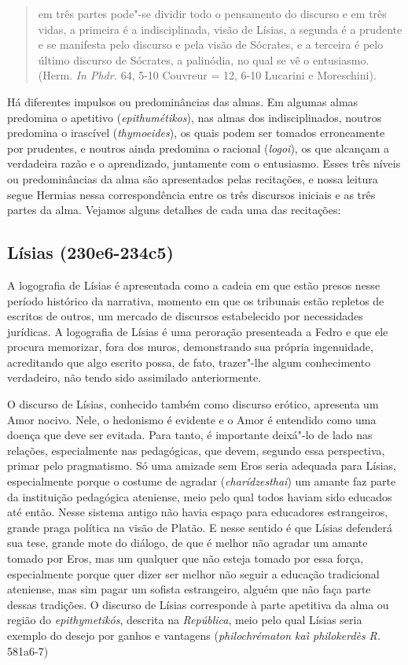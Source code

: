  

\begin{quote}
em três partes pode"-se dividir todo o pensamento do discurso e em três
vidas,
 a primeira é a indisciplinada, visão de Lísias, a segunda é a
prudente e se manifesta pelo discurso e pela visão de Sócrates, e a
terceira é pelo último discurso de Sócrates, a palinódia, no qual se vê
o entusiasmo. (Herm. \emph{In Phdr.} 64, 5-10 Couvreur = 12, 6-10
Lucarini e Moreschini).
\end{quote}

 

Há diferentes impulsos ou predominâncias das almas. Em algumas almas
predomina o apetitivo (\emph{epithumétikos}), nas almas dos
indisciplinados, noutros predomina o irascível (\emph{thymoeides}), os
quais podem ser tomados erroneamente por prudentes, e noutros ainda
predomina o racional (\emph{logoi}), os que alcançam a verdadeira razão
e o aprendizado, juntamente com o entusiasmo. Esses três níveis ou
predominâncias da alma são apresentados pelas recitações, e nossa leitura
segue Hermias nessa correspondência entre os três discursos iniciais e
as três partes da alma. Vejamos alguns detalhes de cada uma das
recitações:


\subsection{Lísias (230e6-234c5)} 


A logografia de Lísias é apresentada
como a cadeia em que estão presos nesse período histórico da narrativa,
momento em que os tribunais estão repletos de escritos de outros, um
mercado de discursos estabelecido por necessidades jurídicas. 
A logografia de Lísias é uma peroração presenteada a Fedro e que ele
procura memorizar, fora dos muros, demonstrando sua própria ingenuidade,
acreditando que algo escrito possa, de fato, trazer"-lhe algum
conhecimento verdadeiro, não tendo sido assimilado anteriormente.

O discurso de Lísias, conhecido também como discurso erótico, apresenta
um Amor nocivo. Nele, o hedonismo é evidente e o Amor é entendido como
uma doença que deve ser evitada. Para tanto, é importante deixá"-lo de
lado nas relações, especialmente nas pedagógicas, que devem, segundo
essa perspectiva, primar pelo pragmatismo. Só uma amizade sem Eros
seria adequada para Lísias, especialmente porque o costume de agradar
(\emph{charídzesthai}) um amante faz parte da instituição pedagógica
ateniense, meio pelo qual todos haviam sido educados até então. Nesse
sistema antigo não havia espaço para educadores estrangeiros, grande
praga política na visão de Platão. E nesse sentido é que Lísias
defenderá sua tese, grande mote do diálogo, de que é melhor não agradar
um amante tomado por Eros, mas um qualquer que não esteja tomado por
essa força, especialmente porque quer dizer ser melhor não seguir a
educação tradicional ateniense, mas sim pagar um sofista estrangeiro,
alguém que não faça parte dessas tradições. O discurso de Lísias
corresponde à parte apetitiva da alma ou região do \emph{epithymetikós},
descrita na \emph{República}, meio pelo qual Lísias seria exemplo do
desejo por ganhos e vantagens (\emph{philochrématon kaì
philokerdès} \emph{R.} 581a6-7)


